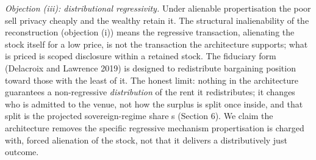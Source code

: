 \documentclass[
  11pt,
]{article}
\begin{document}
\emph{Objection (iii): distributional regressivity.} Under alienable
propertisation the poor sell privacy cheaply and the wealthy retain it.
The structural inalienability of the reconstruction (objection (i))
means the regressive transaction, alienating the stock itself for a low
price, is not the transaction the architecture supports; what is priced
is scoped disclosure within a retained stock. The fiduciary form
(Delacroix and Lawrence 2019) is designed to redistribute bargaining
position toward those with the least of it. The honest limit: nothing in
the architecture guarantees a non-regressive \emph{distribution} of the
rent it redistributes; it changes who is admitted to the venue, not how
the surplus is split once inside, and that split is the projected
sovereign-regime share s (Section 6). We claim the architecture removes
the specific regressive mechanism propertisation is charged with, forced
alienation of the stock, not that it delivers a distributively just
outcome.
\end{document}

